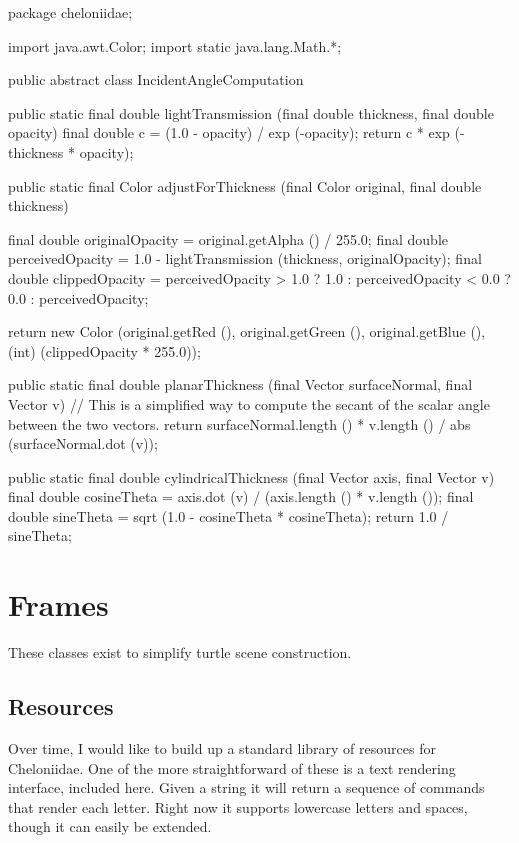 \documentclass{report}
\begin{document}
\begin{javacode}
package cheloniidae;

import java.awt.Color;
import static java.lang.Math.*;

public abstract class IncidentAngleComputation {
  public static final double lightTransmission (final double thickness, final double opacity) {
    final double c = (1.0 - opacity) / exp (-opacity);
    return c * exp (-thickness * opacity);
  }

  public static final Color adjustForThickness (final Color original, final double thickness) {
    final double originalOpacity  = original.getAlpha () / 255.0;
    final double perceivedOpacity = 1.0 - lightTransmission (thickness, originalOpacity);
    final double clippedOpacity   = perceivedOpacity > 1.0 ? 1.0 :
                                    perceivedOpacity < 0.0 ? 0.0 : perceivedOpacity;

    return new Color (original.getRed (), original.getGreen (), original.getBlue (), (int) (clippedOpacity * 255.0));
  }

  public static final double planarThickness (final Vector surfaceNormal, final Vector v) {
    // This is a simplified way to compute the secant of the scalar angle between the two vectors.
    return surfaceNormal.length () * v.length () / abs (surfaceNormal.dot (v));
  }

  public static final double cylindricalThickness (final Vector axis, final Vector v) {
    final double cosineTheta = axis.dot (v) / (axis.length () * v.length ());
    final double sineTheta   = sqrt (1.0 - cosineTheta * cosineTheta);
    return 1.0 / sineTheta;
  }
}
\end{javacode}

\chapter {Frames} \label{sec:frames}
    These classes exist to simplify turtle scene construction.

\section {Resources} \label{sec:resources}
      Over time, I would like to build up a standard library of resources for Cheloniidae. One of the more straightforward of these is a text rendering
      interface, included here. Given a string it will return a sequence of commands that render each letter. Right now it supports lowercase letters and
      spaces, though it can easily be extended.
\end{document}
